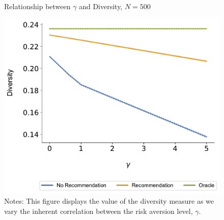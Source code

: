 \documentclass[format=acmsmall, review=true]{acmart}
\begin{document}
\begin{figure}[ht]
\caption{Relationship between $\gamma$ and Diversity, $N = 500$}
\includegraphics[width=.45\linewidth]{figures/gamma_diversity_N_500_T_20}
\caption*{\scriptsize Notes: This figure displays the value of the diversity measure as we vary the inherent correlation between the risk aversion level, $\gamma$.}\label{fig:cor_homo}
\end{figure}


\end{document}
